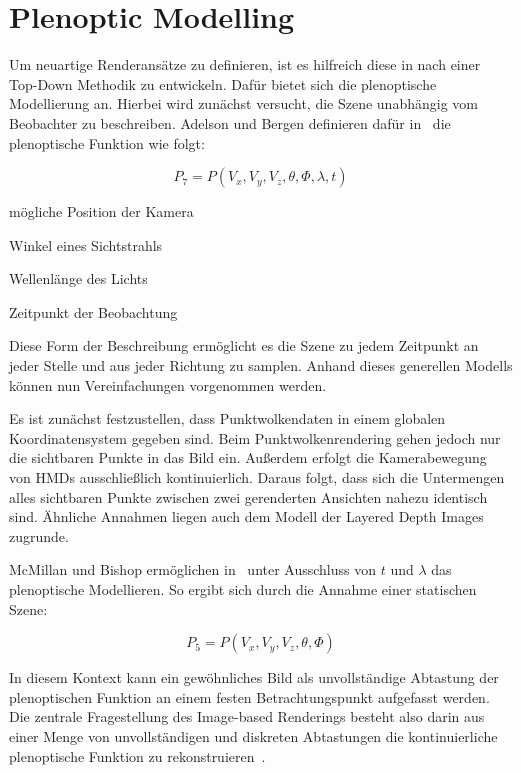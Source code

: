 \documentclass[hyperref, beleg, german]{cgvpub}
\begin{document}
\section{Plenoptic Modelling}

Um neuartige Renderansätze zu definieren, ist es hilfreich diese in nach einer
Top-Down Methodik zu entwickeln. Dafür bietet sich die plenoptische
Modellierung an. Hierbei wird zunächst versucht, die Szene unabhängig vom
Beobachter zu beschreiben. Adelson und Bergen definieren dafür
in~\cite{adelson1991plenoptic} die plenoptische Funktion wie folgt:

\begin{equation}
	P_7 = P(V_x, V_y, V_z, \theta, \Phi, \lambda, t)
\end{equation}

\begin{description}[style=sameline]
	\item[\( V_x, V_y, V_z \)] mögliche Position der Kamera
	\item[\( \theta, \Phi \)] Winkel eines Sichtstrahls
	\item[\( \lambda \)] Wellenlänge des Lichts
	\item[\( t \)] Zeitpunkt der Beobachtung
\end{description}

Diese Form der Beschreibung ermöglicht es die Szene zu jedem Zeitpunkt an jeder
Stelle und aus jeder Richtung zu samplen. Anhand dieses generellen Modells
können nun Vereinfachungen vorgenommen werden.

Es ist zunächst festzustellen, dass Punktwolkendaten in einem globalen
Koordinatensystem gegeben sind. Beim Punktwolkenrendering gehen jedoch nur die
sichtbaren Punkte in das Bild ein. Außerdem erfolgt die Kamerabewegung von HMDs
ausschließlich kontinuierlich. Daraus folgt, dass sich die Untermengen alles
sichtbaren Punkte zwischen zwei gerenderten Ansichten nahezu identisch sind.
Ähnliche Annahmen liegen auch dem Modell der Layered Depth Images zugrunde.

McMillan und Bishop ermöglichen in~\cite{mcmillan1995plenoptic} unter
Ausschluss von \( t \) und \( \lambda \) das plenoptische Modellieren. So
ergibt sich durch die Annahme einer statischen Szene:

\begin{equation}
	P_5 = P(V_x, V_y, V_z, \theta, \Phi)
\end{equation}

In diesem Kontext kann ein gewöhnliches Bild als unvollständige Abtastung der
plenoptischen Funktion an einem festen Betrachtungspunkt aufgefasst werden. Die
zentrale Fragestellung des Image-based Renderings besteht also darin aus einer
Menge von unvollständigen und diskreten Abtastungen die kontinuierliche
plenoptische Funktion zu rekonstruieren~\cite{mcmillan1995plenoptic}.
\end{document}
